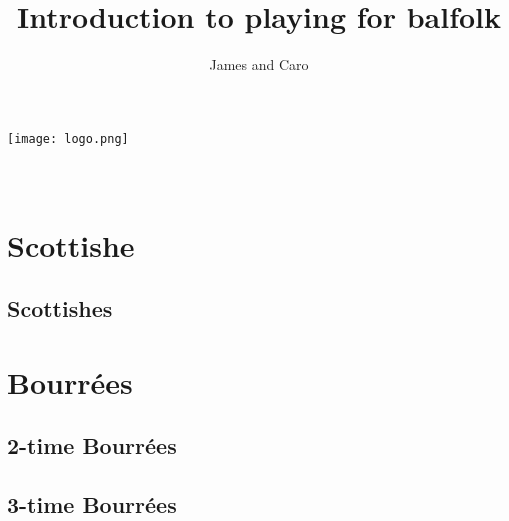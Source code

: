 \documentclass[a4paper,11pt]{article}
\begin{document}
\title{Introduction to playing for balfolk}
\author{James and Caro}
\date{}

\setmainfont{Silkscreen}

\makeatletter
    \begin{titlepage}
        \begin{center}
            \vspace*{\fill}
                \texttt{[image: logo.png]}\\[4ex]
                {\huge \bfseries  \@title }\\[2ex] 
                {\LARGE  \@author}\\[50ex] 
                {\large \@date}
        \end{center}
    \end{titlepage}
\makeatother
\thispagestyle{empty}
\newpage

\tableofcontents

\clearpage

\setcounter{page}{1} %

\section{Scottishe}
\subsection{Scottishes}
\clearpage

\section{Bourrées}
\subsection{2-time Bourrées}
\clearpage
\subsection{3-time Bourrées}
\clearpage
\end{document}
